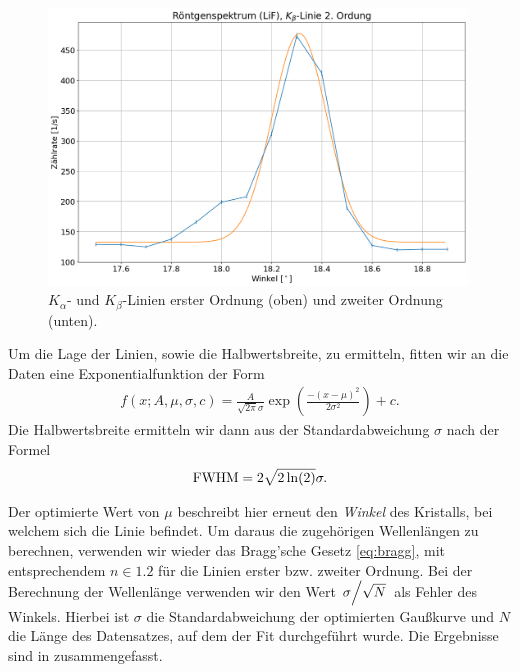 \begin{figure}[H]
\begin{minipage}{0.5\textwidth}
\end{minipage}\hfill
\begin{minipage}{0.5\textwidth}
    \centering
    \includegraphics[width=0.99\textwidth]{files/plots/lif_kbeta_2ord.png}
\end{minipage}
\caption{$K_{\alpha}$- und $K_{\beta}$-Linien erster Ordnung (oben) und zweiter Ordnung (unten).}
\label{fig:lif_kalpha_kbeta}
\end{figure}

Um die Lage der Linien, sowie die Halbwertsbreite, zu ermitteln, fitten wir an die Daten eine Exponentialfunktion der Form
\begin{align}
  f(x;A,\mu,\sigma,c) = \frac{A}{\sqrt{2 \pi}\sigma} \exp(\frac{-(x - \mu)^2}{2 \sigma^2}) + c.
\end{align}
Die Halbwertsbreite ermitteln wir dann aus der Standardabweichung $\sigma$ nach der Formel
\begin{align}
  \mathrm{FWHM} = 2\sqrt{2\ln(2)}\sigma.
\end{align}

Der optimierte Wert von $\mu$ beschreibt hier erneut den \textit{Winkel} des Kristalls, bei welchem sich die Linie befindet. Um daraus die zugehörigen Wellenlängen zu berechnen, verwenden wir wieder das Bragg'sche Gesetz \eqref{eq:bragg}, mit entsprechendem $n \in \qty{1,2}$ für die Linien erster bzw. zweiter Ordnung. Bei der Berechnung der Wellenlänge verwenden wir den Wert $\flatfrac{\sigma}{\sqrt{N}}$ als Fehler des Winkels. Hierbei ist $\sigma$ die Standardabweichung der optimierten Gaußkurve und $N$ die Länge des Datensatzes, auf dem der Fit durchgeführt wurde. Die Ergebnisse sind in  zusammengefasst.


